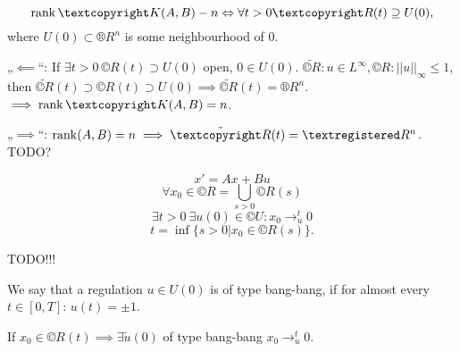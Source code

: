 \documentclass[12pt]{article}					%
\begin{document}
\begin{veta}
	$$ \rank©K(A, B) - n \Leftrightarrow \forall t > 0 ©R(t) \supseteq U(0), $$
	where $U(0) \subset ®R^n$ is some neighbourhood of 0.

	\begin{dukazin}
		„$\impliedby$“: If $\exists t > 0\ ©R(t) \supset U(0)$ open, $0 \in U(0)$. $\tilde{©R}: u \in L^∞, ©R: ||u||_∞ ≤ 1$, then $\tilde{©R}(t) \supset ©R(t) \supset U(0) \implies \tilde{©R}(t) = ®R^n$. $\implies \rank ©K(A, B) = n$.

		„$\implies$“: $\rank(A, B) = n \implies \tilde{©R}(t) = ®R^n$. TODO?
	\end{dukazin}
\end{veta}

\begin{veta}
	$$ x' = Ax + Bu $$
	$$ \forall x_0 \in ©R = \bigcup_{s > 0} ©R(s) $$
	$$ \exists t > 0\ \exists u(0) \in ©U: x_0 \rightarrow_u^t 0 $$
	$$ t = \inf\{s > 0|x_0 \in ©R(s)\}. $$

	\begin{dukazin}
		TODO!!!
	\end{dukazin}
\end{veta}

\begin{definice}
	We say that a regulation $u \in U(0)$ is of type bang-bang, if for almost every $t \in [0, T]$: $u(t) = ±1$.
\end{definice}

\begin{veta}
	If $x_0 \in ©R(t) \implies \exists \tilde u(0)$ of type bang-bang $x_0 \rightarrow_u^t 0$.
\end{veta}
\end{document}
